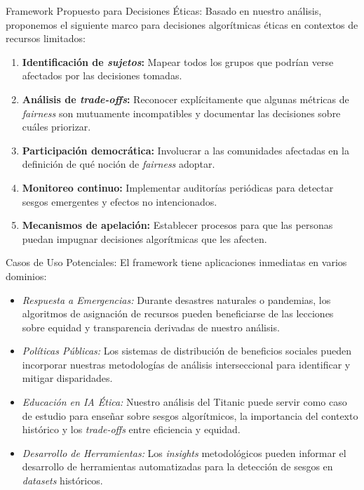 \documentclass[conference]{IEEEtran}
\begin{document}
Framework Propuesto para Decisiones Éticas: Basado en nuestro análisis, proponemos el siguiente marco para decisiones algorítmicas éticas en contextos de recursos limitados:
\begin{enumerate}
    \item \textbf{Identificación de \emph{sujetos}:} Mapear todos los grupos que podrían verse afectados por las decisiones tomadas.
    \item \textbf{Análisis de \emph{trade-offs}:} Reconocer explícitamente que algunas métricas de \emph{fairness} son mutuamente incompatibles y documentar las decisiones sobre cuáles priorizar.
    \item \textbf{Participación democrática:} Involucrar a las comunidades afectadas en la definición de qué noción de \emph{fairness} adoptar.
    \item \textbf{Monitoreo continuo:} Implementar auditorías periódicas para detectar sesgos emergentes y efectos no intencionados.
    \item \textbf{Mecanismos de apelación:} Establecer procesos para que las personas puedan impugnar decisiones algorítmicas que les afecten.
\end{enumerate}

Casos de Uso Potenciales: El framework tiene aplicaciones inmediatas en varios dominios:

\begin{itemize}
    \item \emph{Respuesta a Emergencias:} Durante desastres naturales o pandemias, los algoritmos de asignación de recursos pueden beneficiarse de las lecciones sobre equidad y transparencia derivadas de nuestro análisis.
    
    \item \emph{Políticas Públicas:} Los sistemas de distribución de beneficios sociales pueden incorporar nuestras metodologías de análisis interseccional para identificar y mitigar disparidades.
    
    \item \emph{Educación en IA Ética:} Nuestro análisis del Titanic puede servir como caso de estudio para enseñar sobre sesgos algorítmicos, la importancia del contexto histórico y los \emph{trade-offs} entre eficiencia y equidad.
    
    \item \emph{Desarrollo de Herramientas:} Los \emph{insights} metodológicos pueden informar el desarrollo de herramientas automatizadas para la detección de sesgos en \emph{datasets} históricos.
\end{itemize}
\end{document}
